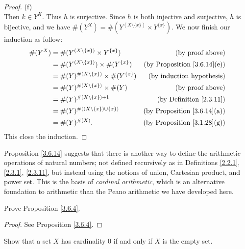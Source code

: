 \begin{proof}{(f)}
\[    \]
    Then \(k \in Y^X\).
    Thus \(h\) is surjective.
    Since \(h\) is both injective and surjective, \(h\) is bijective, and we have \(\#(Y^X) = \#(Y^{(X \setminus \{x\})} \times Y^{\{x\}})\).
    We now finish our induction as follow:
    \begin{align*}
        \#(Y^X) & = \#(Y^{(X \setminus \{x\})} \times Y^{\{x\}})       & \text{(by proof above)}                 \\
                & = \#(Y^{(X \setminus \{x\})}) \times \#(Y^{\{x\}})   & \text{(by Proposition \ref{3.6.14}(e))} \\
                & = \#(Y)^{\#(X \setminus \{x\})} \times \#(Y^{\{x\}}) & \text{(by induction hypothesis)}        \\
                & = \#(Y)^{\#(X \setminus \{x\})} \times \#(Y)         & \text{(by proof above)}                 \\
                & = \#(Y)^{\#(X \setminus \{x\}) + 1}                  & \text{(by Definition \ref{2.3.11})}     \\
                & = \#(Y)^{\#((X \setminus \{x\}) \cup \{x\})}         & \text{(by Proposition \ref{3.6.14}(a))} \\
                & = \#(Y)^{\#(X)}.                                     & \text{(by Proposition \ref{3.1.28}(g))}
    \end{align*}
    This close the induction.
\end{proof}

\begin{remark}\label{3.6.15}
    Proposition \ref{3.6.14} suggests that there is another way to define the arithmetic operations of natural numbers;
    not defined recursively as in Definitions \ref{2.2.1}, \ref{2.3.1}, \ref{2.3.11}, but instead using the notions of union, Cartesian product, and power set.
    This is the basis of \emph{cardinal arithmetic}, which is an alternative foundation to arithmetic than the Peano arithmetic we have developed here.
\end{remark}

\exercisesection

\begin{exercise}\label{ex 3.6.1}
    Prove Proposition \ref{3.6.4}.
\end{exercise}

\begin{proof}
    See Proposition \ref{3.6.4}.
\end{proof}

\begin{exercise}\label{ex 3.6.2}
    Show that a set \(X\) has cardinality \(0\) if and only if \(X\) is the empty set.
\end{exercise}

